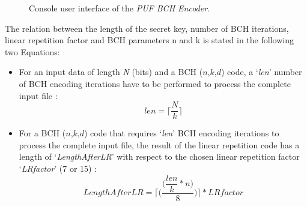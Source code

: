 	\begin{figure}[ht!]
	\centering
	\caption{Console user interface of the \emph{PUF BCH Encoder}.}
	\label{img:4_BCH_ENC_menu}
	\end{figure}
The relation between the length of the secret key, number of BCH iterations, linear repetition factor and BCH parameters n and k is stated in the following two Equations:
	\begin{itemize}
		\item For an input data of length \emph{N} (bits) and a BCH ($n$,$k$,$d$) code, a ‘\emph{len}’ number of BCH encoding iterations have to be performed to process the complete input file \cite{71}:
	\begin{equation}
		len =\Bigg\lceil\dfrac{N}{k}\Bigg\rceil
		\label{4:BCH_len}
	\end{equation}

	\item For a BCH ($n$,$k$,$d$) code that requires ‘\emph{len}’ BCH encoding iterations to process the complete input file, the result of the linear repetition code has a length of ‘\emph{LengthAfterLR}’ with respect to the chosen linear repetition factor ‘\emph{LRfactor}’ (7 or 15) \cite{71}:
	\begin{equation}
		LengthAfterLR = \Bigg\lceil\Bigg(\dfrac{\Bigg(\dfrac{len}{k} * n\Bigg)}{8}\Bigg)\Bigg\rceil * LRfactor
	\label{4:BCH_LR_len}
	\end{equation}
	\end{itemize}

